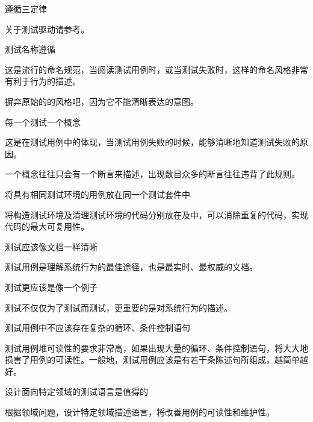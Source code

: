 \begin{content}

\begin{regulation}
遵循三定律
\end{regulation}

\begin{enum}
\end{enum}

关于测试驱动请参考。

\begin{regulation}
测试名称遵循
\end{regulation}

这是流行的命名规范，当阅读测试用例时，或当测试失败时，这样的命名风格非常有利于行为的描述。

摒弃原始的的风格吧，因为它不能清晰表达的意图。

\begin{regulation}
每一个测试一个概念
\end{regulation}

这是在测试用例中的体现，当测试用例失败的时候，能够清晰地知道测试失败的原因。

一个概念往往只会有一个断言来描述，出现数目众多的断言往往违背了此规则。

\begin{regulation}
将具有相同测试环境的用例放在同一个测试套件中
\end{regulation}

将构造测试环境及清理测试环境的代码分别放在及中，可以消除重复的代码，实现代码的最大可复用性。

\begin{regulation}
测试应该像文档一样清晰
\end{regulation}

测试用例是理解系统行为的最佳途径，也是最实时、最权威的文档。

\begin{regulation}
测试更应该是像一个例子
\end{regulation}

测试不仅仅为了测试而测试，更重要的是对系统行为的描述。

\begin{regulation}
测试用例中不应该存在复杂的循环、条件控制语句
\end{regulation}

测试用例堆可读性的要求非常高，如果出现大量的循环、条件控制语句，将大大地损害了用例的可读性。一般地，测试用例应该是有若干条陈述句所组成，越简单越好。

\begin{regulation}
设计面向特定领域的测试语言是值得的
\end{regulation}

根据领域问题，设计特定领域描述语言，将改善用例的可读性和维护性。

\end{content}
